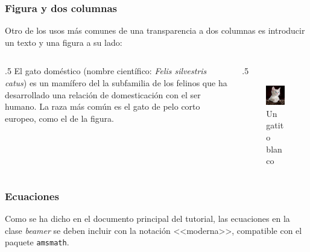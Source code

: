 \documentclass{beamer}
\begin{document}
    \begin{frame}
        \frametitle{Figura y dos columnas}
        Otro de los usos más comunes de una transparencia a dos columnas es
        introducir un texto y una figura a su lado:
        \begin{columns}
            \begin{column}{.5\hsize}
                El gato doméstico (nombre científico:
                \textit{Felis silvestris catus})
                es un mamífero del la subfamilia de los felinos que ha
                desarrollado una relación de domesticación con el ser humano.
                La raza más común es el gato de pelo corto europeo, como el
                de la figura.
            \end{column}
            \begin{column}{.5\hsize}
                \begin{figure}[H]
                    \includegraphics[width=.75\hsize]{gatito}
                    \caption{Un gatito blanco}
                    \label{fig:gatito}
                \end{figure}
            \end{column}
        \end{columns}
    \end{frame}
    \begin{frame}
        \frametitle{Ecuaciones}
        Como se ha dicho en el documento principal del tutorial, las
        ecuaciones en la clase \textit{beamer} se deben incluir con la notación
        <<moderna>>, compatible con el paquete \texttt{amsmath}.
    \end{frame}
\end{document}
